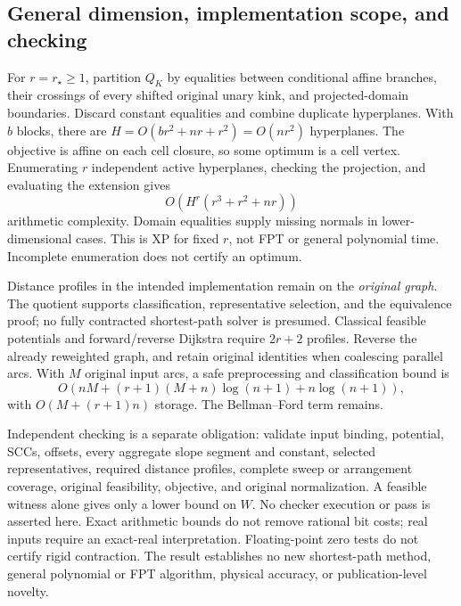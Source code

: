 \subsection{General dimension, implementation scope, and checking}

For \(r=r_\star\ge1\), partition \(Q_K\) by equalities between
conditional affine branches, their crossings of every shifted
original unary kink, and projected-domain boundaries.
Discard constant equalities and combine duplicate hyperplanes.
With \(b\) blocks, there are
\(H=O(br^2+nr+r^2)=O(nr^2)\) hyperplanes.
The objective is affine on each cell closure, so some optimum is a
cell vertex. Enumerating \(r\) independent active hyperplanes,
checking the projection, and evaluating the extension gives
\[
 O\!\left(H^r(r^3+r^2+nr)\right)
\]
arithmetic complexity. Domain equalities supply missing normals
in lower-dimensional cases. This is XP for fixed \(r\), not FPT
or general polynomial time. Incomplete enumeration does not certify
an optimum.

Distance profiles in the intended implementation remain on the
\emph{original graph}. The quotient supports classification,
representative selection, and the equivalence proof; no fully
contracted shortest-path solver is presumed. Classical feasible
potentials and forward/reverse Dijkstra require \(2r+2\) profiles.
Reverse the already reweighted graph, and retain original identities
when coalescing parallel arcs. With \(M\) original input arcs, a
safe preprocessing and classification bound is
\[
 O\!\left(nM+(r+1)(M+n)\log(n+1)+n\log(n+1)\right),
\]
with \(O(M+(r+1)n)\) storage. The Bellman--Ford term remains.

Independent checking is a separate obligation: validate input
binding, potential, SCCs, offsets, every aggregate slope segment
and constant, selected representatives, required distance profiles,
complete sweep or arrangement coverage, original feasibility,
objective, and original normalization. A feasible witness alone
gives only a lower bound on \(W\). No checker execution or pass is
asserted here. Exact arithmetic bounds do not remove rational bit
costs; real inputs require an exact-real interpretation.
Floating-point zero tests do not certify rigid contraction.
The result establishes no new shortest-path method, general
polynomial or FPT algorithm, physical accuracy, or publication-level
novelty.
